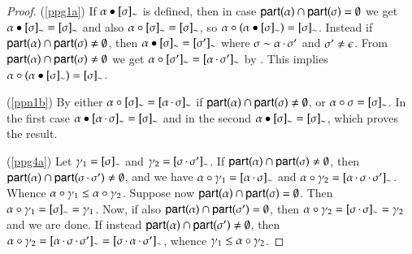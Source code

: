 \begin{proof}
  (\ref{ppg1a}) If ${\alpha}\bullet{\ensuremath{[\sigma]_{\sim}}}$ is defined, then
  in case ${\sf part}(\alpha)\cap{\sf part}(\sigma)=\emptyset$ we get
  ${\alpha}\bullet{\ensuremath{[\sigma]_{\sim}}}=[\sigma]_{\sim}$ and also
  ${\alpha}\circ{\ensuremath{[\sigma]_{\sim}}}=[\sigma]_{\sim}$, so
  ${\alpha}\circ{(\ensuremath{{\alpha}\bullet{\ensuremath{[\sigma]_{\sim}}}})}=[\sigma]_{\sim}$.
  Instead if ${\sf part}(\alpha)\cap{\sf part}(\sigma)\not=\emptyset$, then
  ${\alpha}\bullet{\ensuremath{[\sigma]_{\sim}}}=[\sigma']_{\sim}$ where
  $\sigma\sim\alpha\,{\cdot}\,\sigma'$ and
  $\sigma'\neq\epsilon$.   From ${\sf part}(\alpha)\cap{\sf part}(\sigma)\not=\emptyset$ we get 
  ${\alpha}\circ{\ensuremath{[\sigma']_{\sim}}}=[\alpha\,{\cdot}\,\sigma']_{\sim}$ by . This 
  implies ${\alpha}\circ{(\ensuremath{{\alpha}\bullet{\ensuremath{[\sigma]_{\sim}}}})}=[\sigma]_{\sim}$. 
  
  (\ref{ppn1b}) By  either
  ${\alpha}\circ{\ensuremath{[\sigma]_{\sim}}}=[\alpha\,{\cdot}\,\sigma]_{\sim}$
  if ${\sf part}(\alpha)\cap{\sf part}(\sigma)\not=\emptyset$, or
  ${\alpha}\circ{ \sigma }=[\sigma]_{\sim}$.  In the first
  case
  ${\alpha}\bullet{\ensuremath{[\alpha\,{\cdot}\,\sigma]_{\sim}}}=[\sigma]_{\sim}$
  and in the second
  ${\alpha}\bullet{\ensuremath{[\sigma]_{\sim}}}=[\sigma]_{\sim}$, which proves the result. 
  
  (\ref{ppg4a})
   Let $\gamma_1=[\sigma]_{\sim}$ and
  $\gamma_2=[\sigma\,{\cdot}\,\sigma']_{\sim}$.  If  %
  ${\sf part}(\alpha) \cap {\sf part}(\sigma) \neq \emptyset$,
  then %
  ${\sf part}(\alpha)
  \cap {\sf part}(\sigma\,{\cdot}\,\sigma') \neq \emptyset$, and
  we have
  ${\alpha}\circ{\ensuremath{\gamma}_1}=[\alpha\,{\cdot}\,\sigma]_{\sim}$ and
  ${\alpha}\circ{\ensuremath{\gamma}_2}=[\alpha\,{\cdot}\,\sigma\,{\cdot}\,\sigma']_{\sim}$.
Whence ${\alpha}\circ{\ensuremath{\gamma}_1} \leq {\alpha}\circ{\ensuremath{\gamma}_2}$.
  Suppose now ${\sf part}(\alpha) \cap {\sf part}(\sigma) =
  \emptyset$. Then ${\alpha}\circ{\ensuremath{\gamma}_1}=[\sigma]_{\sim} =
  \gamma_1$. Now, if also  ${\sf part}(\alpha) \cap {\sf part}(\sigma') =
  \emptyset$, then ${\alpha}\circ{\ensuremath{\gamma}_2}=[\sigma\,{\cdot}\,\sigma]_{\sim} =
  \gamma_2$ and we are done. If instead ${\sf part}(\alpha) \cap {\sf part}(\sigma') \neq
  \emptyset$, then ${\alpha}\circ{\ensuremath{\gamma}_2}=[\alpha\,{\cdot}\,\sigma\,{\cdot}\,\sigma']_{\sim} =
[\sigma\,{\cdot}\,\alpha\,{\cdot}\,\sigma']_{\sim}$, whence $\gamma_1 \leq {\alpha}\circ{\ensuremath{\gamma}_2}$.


\end{proof}
